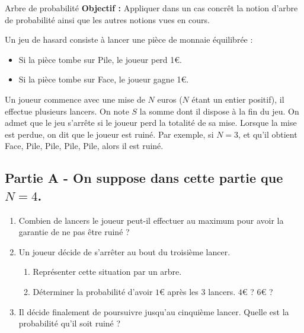 \documentclass[12pt]{article}
\theoremstyle{break}
\begin{document}
\noindent{
\makebox[0pt][l]{\textbf{\Niveau}}%
\makebox[\textwidth][c]{\textbf{\Chapitre}}%
\makebox[0pt][r]{\textbf{\Document}}
}

\begin{activite*}{Arbre de probabilité}{}
    \textbf{Objectif :} Appliquer dans un cas concrêt la notion d'arbre de probabilité ainsi que les autres notions vues en cours.
\end{activite*}

Un jeu de hasard consiste à lancer une pièce de monnaie équilibrée :
\begin{itemize}
    \item Si la pièce tombe sur Pile, le joueur perd 1€.
    \item Si la pièce tombe sur Face, le joueur gagne 1€.
\end{itemize}

Un joueur commence avec une mise de \( N \) euros (\( N \) étant un entier positif), il effectue plusieurs lancers. On note \( S \) la somme dont il dispose à la fin du jeu. On admet que le jeu s’arrête si le joueur perd la totalité de sa mise. Lorsque la mise est perdue, on dit que le joueur est ruiné. Par exemple, si \( N = 3 \), et qu’il obtient Face, Pile, Pile, Pile, Pile, alors il est ruiné.

\subsection*{Partie A - On suppose dans cette partie que \( N = 4 \).}
\begin{enumerate}
    \item Combien de lancers le joueur peut-il effectuer au maximum pour avoir la garantie de ne pas être ruiné ?
    \item Un joueur décide de s’arrêter au bout du troisième lancer.
    \begin{enumerate}
        \item Représenter cette situation par un arbre.
        \item Déterminer la probabilité d’avoir \( 1€ \) après les 3 lancers. \( 4€ \) ? \( 6€ \) ?
    \end{enumerate}
    \item Il décide finalement de poursuivre jusqu’au cinquième lancer. Quelle est la probabilité qu’il soit ruiné ?
\end{enumerate}
\end{document}
